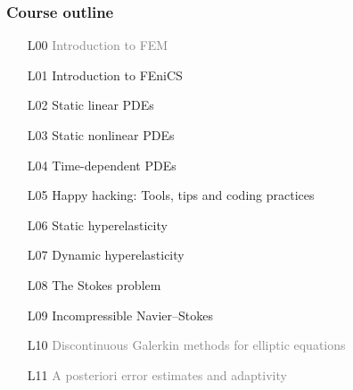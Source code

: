\documentclass{fenicscourse}
\begin{document}

\begin{frame}
  \frametitle{Course outline}




  \small

  \begin{enumerate}
  \item[L00]
    \textcolor{grey}{Introduction to FEM}
  \item[L01]
    Introduction to FEniCS
  \item[L02]
    Static linear PDEs
  \item[L03]
    Static nonlinear PDEs
  \item[L04]
    Time-dependent PDEs
  \item[L05]
    Happy hacking: Tools, tips and coding practices
  \item[L06]
    Static hyperelasticity
  \item[L07]
    Dynamic hyperelasticity
  \item[L08]
    The Stokes problem
  \item[L09]
    Incompressible Navier--Stokes
  \item[L10]
    \textcolor{grey}{Discontinuous Galerkin methods for elliptic equations}
  \item[L11]
    \textcolor{grey}{A posteriori error estimates and adaptivity}
  \end{enumerate}


\end{frame}
\end{document}
